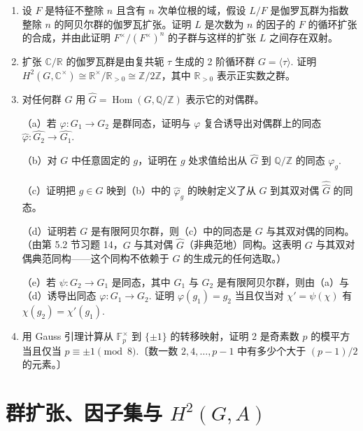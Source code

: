 \begin{enumerate}
（b）证明函数 \(f(\sigma) = \sigma(\sqrt[n]{a})/\sqrt[n]{a}\) 是 \(G\) 的、取值在 \(K\) 中 \(n\) 次单位根群 \(\mu_n\) 中的 1-上闭链（注意并不假设 \(\mu_n\) 含于 \(F\)）。

（c）证明在 \(K\) 中选取不同的 \(n\) 次根 \(a\) 所得的 1-上闭链与（b）中的 1-上闭链相差一个 1-上边界。

\item 设 \(F\) 是特征不整除 \(n\) 且含有 \(n\) 次单位根的域，假设 \(L/F\) 是伽罗瓦群为指数整除 \(n\) 的阿贝尔群的伽罗瓦扩张。证明 \(L\) 是次数为 \(n\) 的因子的 \(F\) 的循环扩张的合成，并由此证明 \(F^\times/(F^\times)^n\) 的子群与这样的扩张 \(L\) 之间存在双射。

\item 扩张 \(\mathbb{C}/\mathbb{R}\) 的伽罗瓦群是由复共轭 \(\tau\) 生成的 2 阶循环群 \(G = \langle\tau\rangle\). 证明 \(H^2(G, \mathbb{C}^\times) \cong \mathbb{R}^\times/\mathbb{R}_{>0} \cong \mathbb{Z}/2\mathbb{Z}\)，其中 \(\mathbb{R}_{>0}\) 表示正实数之群。

\item 对任何群 \(G\) 用 \(\widehat G = \operatorname{Hom}(G, \mathbb{Q}/\mathbb{Z})\) 表示它的对偶群。

（a）若 \(\varphi : G_1 \to G_2\) 是群同态，证明与 \(\varphi\) 复合诱导出对偶群上的同态 \(\widehat\varphi : \widehat{G_2} \to \widehat{G_1}\).

（b）对 \(G\) 中任意固定的 \(g\)，证明在 \(g\) 处求值给出从 \(\widehat G\) 到 \(\mathbb{Q}/\mathbb{Z}\) 的同态 \(\varphi_g\).

（c）证明把 \(g \in G\) 映到（b）中的 \(\widehat\varphi_g\) 的映射定义了从 \(G\) 到其双对偶 \(\widehat{\widehat G}\) 的同态。

（d）证明若 \(G\) 是有限阿贝尔群，则（c）中的同态是 \(G\) 与其双对偶的同构。（由第 5.2 节习题 14，\(G\) 与其对偶 \(\widehat G\)（非典范地）同构。这表明 \(G\) 与其双对偶典范同构——这个同构不依赖于 \(G\) 的生成元的任何选取。）

（e）若 \(\psi : G_2 \to G_1\) 是同态，其中 \(G_1\) 与 \(G_2\) 是有限阿贝尔群，则由（a）与（d）诱导出同态 \(\varphi : G_1 \to G_2\). 证明 \(\varphi(g_1) = g_2\) 当且仅当对 \(\chi' = \psi(\chi)\) 有 \(\chi(g_2) = \chi'(g_1)\).

\item 用 Gauss 引理计算从 \(\mathbb{F}_p^\times\) 到 \(\{\pm1\}\) 的转移映射，证明 2 是奇素数 \(p\) 的模平方当且仅当 \(p \equiv \pm1 \pmod 8\).〔数一数 \(2, 4, \ldots, p-1\) 中有多少个大于 \((p-1)/2\) 的元素。〕
\end{enumerate}
\section{群扩张、因子集与 \(H^2(G,A)\)}

